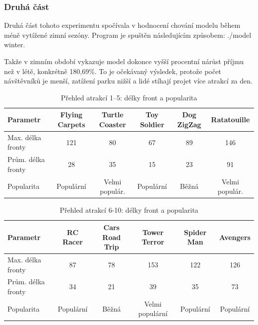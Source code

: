 \documentclass[a4paper,12pt]{article}
\begin{document}
\subsubsection{Druhá část}
Druhá část tohoto experimentu spočívala v hodnocení chování modelu během méně vytížené zimní sezóny. Program je spuštěn následujícím způsobem: ./model winter.

Takže v zimním období vykazuje model dokonce vyšší procentní nárůst příjmu než v létě, konkrétně 180,69\%. To je očekávaný výsledek, protože počet návštěvníků je menší, zatížení parku nižší a lidé stíhají projet více atrakcí za den.

\begin{table}[h!]
	\centering
	\caption{Přehled atrakcí 1–5: délky front a popularita}
	\label{tab:attractions_overview_1_5}
	\begin{tabular}{|l|c|c|c|c|c|}
		\hline
		\textbf{Parametr}&\textbf{Flying Carpets}&\textbf{Turtle Coaster}&\textbf{Toy Soldier}&\textbf{Dog ZigZag}&\textbf{Ratatouille}\\ \hline
		Max. délka fronty   &121                 & 80                 & 67                 & 89                 & 146      \\ \hline
		Prům. délka fronty  &28                 & 35                 & 15                 & 23                 & 91         \\ \hline
		Popularita          &Populární         &Velmi populár.        &Populární          & Běžná          &Velmi populár.\\ \hline
	\end{tabular}
\end{table}
\begin{table}[h!]
	\centering
	\caption{Přehled atrakcí 6-10: délky front a popularita}
	\label{tab:attractions_overview_6_10}
	\begin{tabular}{|l|c|c|c|c|c|}
		\hline
		\textbf{Parametr}   & \textbf{RC  Racer}& \textbf{Cars Road Trip}& \textbf{Tower Terror}& \textbf{Spider Man}& \textbf{Avengers}\\ \hline
		Max. délka fronty   & 87                 & 78                & 153                 & 122               & 126               \\ \hline
		Prům. délka fronty  & 34                & 21                 & 39                & 35                 & 73               \\ \hline
		Popularita          & Populární             & Běžná              & Velmi populární        & Populární          & Populární   \\ \hline
	\end{tabular}
\end{table}
\end{document}
